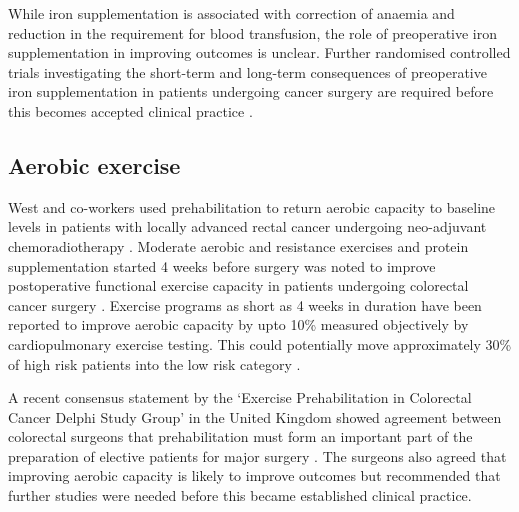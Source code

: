 While iron supplementation is associated with correction of anaemia and reduction in the requirement for blood transfusion, the role of preoperative iron supplementation in improving outcomes is unclear. 
Further randomised controlled trials investigating the short-term and long-term consequences of preoperative iron supplementation in patients undergoing cancer surgery are required before this becomes accepted clinical practice \parencite{beris_perioperative_2008,hallet_impact_2014}.

\subsection{Aerobic exercise}

West and co-workers used prehabilitation to return aerobic capacity to baseline levels in patients with locally advanced rectal cancer undergoing neo-adjuvant chemoradiotherapy \parencite{west_effect_2015}.
Moderate aerobic and resistance exercises and protein supplementation started 4 weeks before surgery was noted to improve postoperative functional exercise capacity in patients undergoing colorectal cancer surgery \parencite{gillis_prehabilitation_2014}.
Exercise programs as short as 4 weeks in duration have been reported to improve aerobic capacity by upto 10\%  measured objectively by cardiopulmonary exercise testing.
This could potentially move approximately 30\% of high risk patients into the low risk category \parencite{dunne_pmo-029_2012}.

A recent consensus statement by the `Exercise Prehabilitation in Colorectal Cancer Delphi Study Group' in the United Kingdom showed agreement between colorectal surgeons that prehabilitation must form an important part of the preparation of elective patients for major surgery \parencite{boereboom_forming_2015}. 
The surgeons also agreed that improving aerobic capacity is likely to improve outcomes but recommended that further studies were needed before this became established clinical practice.


